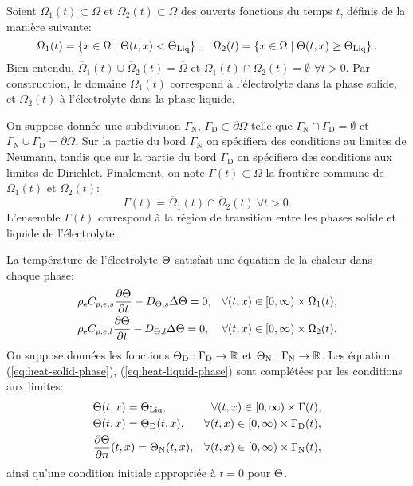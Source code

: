 Soient $\Omega_1(t)\subset \Omega$ et $\Omega_2(t)\subset \Omega$
des ouverts fonctions du temps $t$, définis de la manière suivante:
\begin{equation}
  \Omega_1(t) = \cparent{x\in\Omega \mid %
                         \temperature(t, x) < \tliq},\quad %
  \Omega_2(t) = \cparent{x\in\Omega \mid \temperature(t, x) %
                         \geq \tliq}.
\end{equation}
Bien entendu, $\overline\Omega_1(t)\cup \overline\Omega_2(t) = \overline\Omega$ et
$\Omega_1(t) \cap \Omega_2(t) = \emptyset$ $\forall t > 0$. Par
construction, le domaine $\Omega_1(t)$ correspond à l'électrolyte
dans la phase solide, et $\Omega_2(t)$ à l'électrolyte dans la
phase liquide.

On suppose donnée une subdivision $\Gamma_\mathrm{N}$,
$\Gamma_\mathrm{D}\subset \partial \Omega$ telle que
$\Gamma_\mathrm{N}\cap \Gamma_\mathrm{D} = \emptyset$ et
$\Gamma_\mathrm{N}\cup \Gamma_\mathrm{D} =
\partial \Omega$. Sur la partie du bord $\Gamma_\mathrm{N}$ on
spécifiera des conditions au limites de Neumann, tandis que sur la
partie du bord $\Gamma_\mathrm{D}$ on spécifiera des conditions aux
limites de Dirichlet. Finalement, on note $\Gamma(t)\subset \Omega$ la
frontière commune de $\Omega_1(t)$  et $\Omega_2(t)$:
\begin{equation}
  \Gamma(t) = \overline \Omega_1(t)\cap\overline \Omega_2(t)\ \forall
  t > 0.
\end{equation}
L'ensemble $\Gamma(t)$ correspond à la région de transition entre
les phases solide et liquide de l'électrolyte.

La température de l'électrolyte $\Theta$ satisfait une
équation de la chaleur dans chaque phase:
\begin{align}
  &\rho_\mathrm{e}C_{p,e,s} \frac{\partial
    \Theta}{\partial t} - D_{\Theta,s} \Delta\Theta
  = 0, & \forall (t, x) \in [0,\infty)\times \Omega_1(t),\label{eq:heat-solid-phase}\\
    &\rho_\mathrm{e}C_{p,e,l} \frac{\partial
    \Theta}{\partial t} - D_{\Theta,l} \Delta\Theta
  = 0, & \forall (t, x) \in [0,\infty)\times \Omega_2(t).\label{eq:heat-liquid-phase}
\end{align}
On suppose données les fonctions
$\Theta_\mathrm{D}:\Gamma_\mathrm{D}\to\mathbb R$ et
$\Theta_\mathrm{N}:\Gamma_\mathrm{N}\to\mathbb R$. Les
équation (\ref{eq:heat-solid-phase}), (\ref{eq:heat-liquid-phase})
sont complétées par les conditions aux limites:
\begin{align}
  &\temperature(t, x) = \tliq, %
  &\forall (t, x) \in [0,\infty)\times\Gamma(t),\label{eq:heat-transition}\\
  &\temperature(t, x) = \temperature_\mathrm{D}(t, x), %
  &\forall (t, x) \in [0,\infty)\times\Gamma_\mathrm{D}(t),\label{eq:heat-dirichlet}\\
  &\frac{\partial \temperature}{\partial n}(t, x) = \temperature_\mathrm{N}(t, x), %
  &\forall (t, x) \in [0,\infty)\times\Gamma_\mathrm{N}(t),\label{eq:heat-neumann}
\end{align}
ainsi qu'une condition initiale appropriée à $t = 0$ pour $\Theta$.

